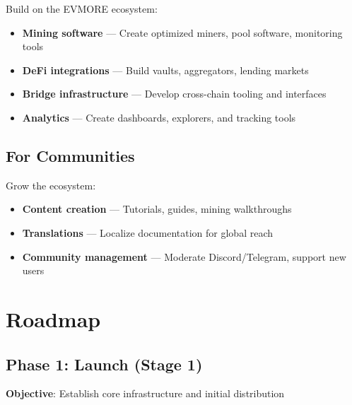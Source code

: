 \documentclass[11pt,a4paper]{article}
\begin{document}
Build on the EVMORE ecosystem:

\begin{itemize}
    \item \textbf{Mining software} --- Create optimized miners, pool software, monitoring tools
    \item \textbf{DeFi integrations} --- Build vaults, aggregators, lending markets
    \item \textbf{Bridge infrastructure} --- Develop cross-chain tooling and interfaces
    \item \textbf{Analytics} --- Create dashboards, explorers, and tracking tools
\end{itemize}

\subsection{For Communities}

Grow the ecosystem:

\begin{itemize}
    \item \textbf{Content creation} --- Tutorials, guides, mining walkthroughs
    \item \textbf{Translations} --- Localize documentation for global reach
    \item \textbf{Community management} --- Moderate Discord/Telegram, support new users
\end{itemize}

\section{Roadmap}

\subsection{Phase 1: Launch (Stage 1)}

\textbf{Objective}: Establish core infrastructure and initial distribution
\end{document}
